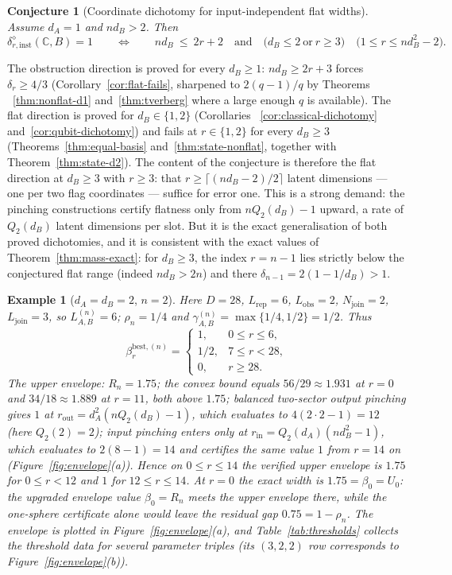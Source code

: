 \documentclass[11pt,a4paper]{article}
\newtheorem{example}[theorem]{Example}
\newtheorem{conjecture}[theorem]{Conjecture}
\begin{document}
\begin{conjecture}[Coordinate dichotomy for input-independent flat widths]
\label{con:coord-flat}
Assume $d_A=1$ and $nd_B>2$. Then
\[
\delta_{r,\mathrm{inst}}^{\diamond}(\mathbb C,B)=1
\qquad\Longleftrightarrow\qquad
nd_B\ \le\ 2r+2
\quad\text{and}\quad
\bigl(d_B\le2\ \text{or}\ r\ge3\bigr) \quad\big(1\le r\le nd_B^2-2\big).
\]
\end{conjecture}

The obstruction direction is proved for every $d_B\ge1$: $nd_B\ge2r+3$ forces
$\delta_r\ge4/3$ (Corollary~\ref{cor:flat-fails}, sharpened to $2(q-1)/q$ by Theorems
~\ref{thm:nonflat-d1} and~\ref{thm:tverberg} where a large enough $q$ is available).
The flat direction is proved for $d_B\in\{1,2\}$ (Corollaries ~\ref{cor:classical-dichotomy} and~\ref{cor:qubit-dichotomy}) and fails at $r\in\{1,2\}$ for every $d_B\ge3$ (Theorems~\ref{thm:equal-basis} and~\ref{thm:state-nonflat}, together with Theorem~\ref{thm:state-d2}). The content of the conjecture is therefore the flat direction at $d_B\ge3$ with $r\ge3$: that
$r\ge\lceil(nd_B-2)/2\rceil$ latent dimensions --- one per two flag coordinates ---
suffice for error one. This is a strong demand: the pinching constructions certify
flatness only from $nQ_2(d_B)-1$ upward, a rate of $Q_2(d_B)$ latent dimensions per
slot. But it is the exact generalisation of both proved dichotomies, and it is
consistent with the exact values of Theorem~\ref{thm:mass-exact}: for $d_B\ge3$, the
index $r=n-1$ lies strictly below the conjectured flat range (indeed $nd_B>2n$) and
there $\delta_{n-1}=2(1-1/d_B)>1$.

\begin{example}[$d_A=d_B=2$, $n=2$]
\label{ex:222}
Here $D=28$, $L_{\mathrm{rep}}=6$, $L_{\mathrm{obs}}=2$, $N_{\mathrm{join}}=2$, $L_{\mathrm{join}}=3$, so $L_{A,B}^{(n)}=6$; $\rho_n=1/4$ and $\gamma_{A,B}^{(n)}=\max\{1/4,1/2\}=1/2$. Thus
\[
\beta_r^{\mathrm{best},(n)}=
\begin{cases}
1,&0\le r\le6,\\
1/2,&7\le r<28,\\
0,&r\ge28.
\end{cases}
\]
The upper envelope: $R_n=1.75$; the convex bound equals $56/29\approx1.931$ at $r=0$ and $34/18\approx1.889$ at $r=11$, both above $1.75$; balanced two-sector output pinching gives $1$ at $r_{\mathrm{out}}=d_A^2(nQ_2(d_B)-1)$, which evaluates to $4(2\cdot2-1)=12$ (here $Q_2(2)=2$); input pinching enters only at $r_{\mathrm{in}}=Q_2(d_A)(nd_B^2-1)$, which evaluates to $2(8-1)=14$ and certifies the same value $1$ from $r=14$ on (Figure~\ref{fig:envelope}(a)). Hence on $0\le r\le14$ the verified upper envelope is $1.75$ for $0\le r<12$ and $1$ for $12\le r\le14$. At $r=0$ the exact width is $1.75=\beta_0=U_0$: the upgraded envelope value $\beta_0=R_n$ meets the upper envelope there, while the one-sphere certificate alone would leave the residual gap $0.75=1-\rho_n$. The envelope is plotted in Figure~\ref{fig:envelope}(a), and Table~\ref{tab:thresholds} collects the threshold data for several parameter triples (its $(3,2,2)$ row corresponds to Figure~\ref{fig:envelope}(b)).
\end{example}
\end{document}
